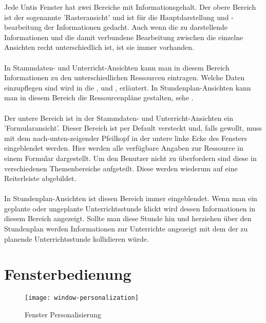 Jede Untis Fenster hat zwei Bereiche mit Informationsgehalt. Der obere Bereich ist der sogenannte 'Rasteransicht' und ist für die Hauptdarstellung und -bearbeitung der Informationen gedacht. Auch wenn die zu darstellende Informationen und die damit verbundene Bearbeitung zwischen die einzelne Ansichten recht unterschiedlich ist, ist sie immer vorhanden.\\
\\
In Stammdaten- und Unterricht-Ansichten kann man in diesem Bereich Informationen zu den unterschiedlichen Ressourcen eintragen. Welche Daten einzupflegen sind wird in die , und , erläutert. In Stundenplan-Ansichten kann man in diesem Bereich die Ressourcenpläne gestalten, sehe .\\
\\
Der untere Bereich ist in der Stammdaten- und Unterricht-Ansichten ein 'Formularansicht'. Dieser Bereich ist per Default versteckt und, falls gewollt, muss mit dem nach-unten-zeigender Pfeilkopf in der untere linke Ecke des Fensters eingeblendet werden. Hier werden alle verfügbare Angaben zur Ressource in einem Formular dargestellt. Um den Benutzer nicht zu überfordern sind diese in verschiedenen Themenbereiche aufgeteilt. Diese werden wiederum auf eine Reiterleiste abgebildet.\\
\\
In Stundenplan-Ansichten ist diesen Bereich immer eingeblendet. Wenn man ein geplante oder ungeplante Unterrichtsstunde klickt wird dessen Informationen in diesem Bereich angezeigt. Sollte man diese Stunde hin und herziehen über den Stundenplan werden Informationen zur Unterrichte angezeigt mit dem der zu planende Unterrichtsstunde kollidieren würde.\\

\section{Fensterbedienung}

\begin{wrapfigure}{r}{0.4\textwidth}
	\vspace{-14pt}
	\texttt{[image: window-personalization]}
	\vspace{-5pt}
	\caption{Fenster Personalisierung}
	\label{fig:window-personalization}
\end{wrapfigure}

